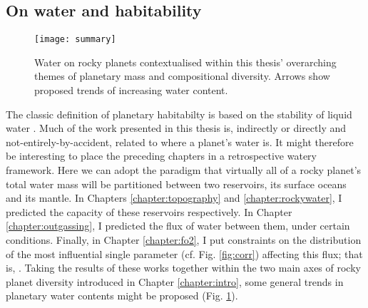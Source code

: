 \subsection{On water and habitability}

\begin{figure}
  \centering
  \texttt{[image: summary]}
\caption[Summary cartoon of water on rocky planets in the context of their mass and compositional diversity.]{Water on rocky planets contextualised within this thesis' overarching themes of planetary mass and compositional diversity. Arrows show proposed trends of increasing water content.}
\label{fig:surfacewater}
\end{figure}




The classic definition of planetary habitabilty is based on the stability of liquid water \citep{kasting_habitable_1993}. Much of the work presented in this thesis is, indirectly or directly and not-entirely-by-accident, related to where a planet's water is. It might therefore be interesting to place the preceding chapters in a retrospective watery framework. Here we can adopt the paradigm that virtually all of a rocky planet's total water mass will be partitioned between two reservoirs, its surface oceans and its mantle. In Chapters \ref{chapter:topography} and \ref{chapter:rockywater}, I predicted the capacity of these reservoirs respectively. In Chapter \ref{chapter:outgassing}, I predicted the flux of water between them, under certain conditions. Finally, in Chapter \ref{chapter:fo2}, I put constraints on the distribution of the most influential single parameter (cf. Fig. \ref{fig:corr}) affecting this flux; that is, \fo. Taking the results of these works together within the two main axes of rocky planet diversity introduced in Chapter \ref{chapter:intro}, some general trends in planetary water contents might be proposed (Fig. \ref{fig:surfacewater}).


